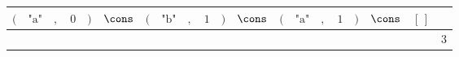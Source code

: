 {\scriptsize\setlength{\tabcolsep}{1.5pt}%
\begin{tabular}{ccccccccccccccccccc|l}
$($ & $\text{"a"}$ & $,$ & $\text{0}$ & $)$ & $\cons$ & $($ & $\text{"b"}$ & $,$ & $\text{1}$ & $)$ & $\cons$ & $($ & $\text{"a"}$ & $,$ & $\text{1}$ & $)$ & $\cons$ & $[\,]$ & \\ \hline
\gcell{$$} & \gcell{$$} & \gcell{$$} & \gcell{$$} & \gcell{$$} & \gcell{$\posC{\circ}$} & \gcell{$$} & \gcell{$$} & \gcell{$$} & \gcell{$$} & \gcell{$$} & \gcell{$\posC{\circ}$} & \gcell{$$} & \gcell{$$} & \gcell{$$} & \gcell{$$} & \gcell{$$} & \gcell{$\posC{\circ}$} & \gcell{$\posC{\circ}$} & $\text{3}$ \\
\end{tabular}}
